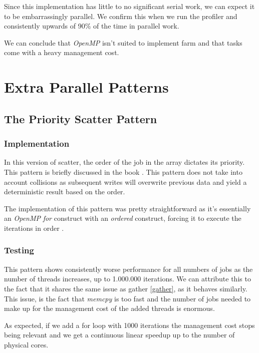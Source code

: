 \documentclass[10pt,journal]{IEEEtran}
\begin{document}
Since this implementation has little to no significant serial work, we can expect it to be embarrassingly parallel. We confirm this when we run the profiler and consistently upwards of 90\% of the time in parallel work.

We can conclude that \textit{OpenMP} isn't suited to implement farm and that tasks come with a heavy management cost. 

\section{Extra Parallel Patterns}

\subsection{The Priority Scatter Pattern}
\subsubsection{Implementation}

In this version of scatter, the order of the job in the array dictates its priority. This pattern is briefly discussed in the book \cite{mccool}. This pattern does not take into account collisions as subsequent writes will overwrite previous data and yield a deterministic result based on the order.

The implementation of this pattern was pretty straightforward as it's essentially an \textit{OpenMP} \textit{for} construct with an \textit{ordered} construct, forcing it to execute the iterations in order \cite{omporder}.

\subsubsection{Testing}

This pattern shows consistently worse performance for all numbers of jobs as the number of threads increases, up to 1.000.000 iterations. We can attribute this to the fact that it shares the same issue as gather \ref{gather}, as it behaves similarly. This issue, is the fact that \textit{memcpy} is too fast and the number of jobs needed to make up for the management cost of the added threads is enormous.

As expected, if we add a for loop with 1000 iterations the management cost stops being relevant and we get a continuous linear speedup up to the number of physical cores. 
\end{document}
